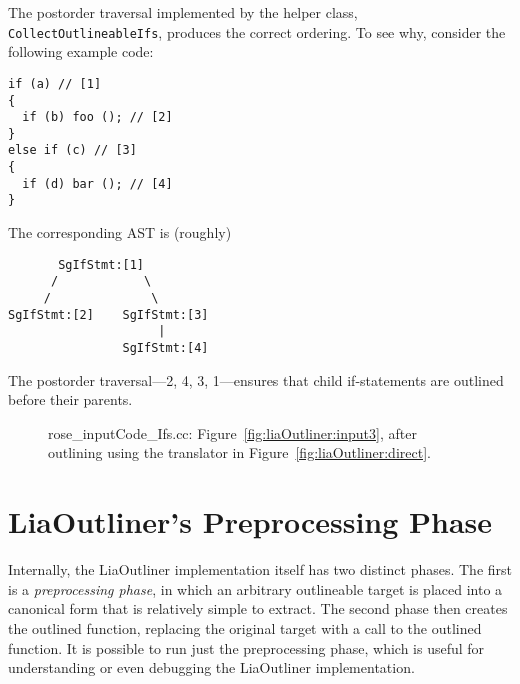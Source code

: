The postorder traversal implemented by the helper class,
\texttt{CollectOutlineableIfs}, produces the correct ordering.  To see
why, consider the following example code:
%
\begin{lstlisting}
if (a) // [1]
{
  if (b) foo (); // [2]
}
else if (c) // [3]
{
  if (d) bar (); // [4]
}
\end{lstlisting}
%
The corresponding AST is (roughly)
\begin{verbatim}
       SgIfStmt:[1]
      /            \
     /              \
SgIfStmt:[2]    SgIfStmt:[3]
                     | 
                SgIfStmt:[4]
\end{verbatim}
%
The postorder traversal---2, 4, 3, 1---ensures that child
if-statements are outlined before their parents.

\begin{figure}[!h]
{\indent
{\mySmallFontSize
\begin{latexonly}
   
\end{latexonly}
\begin{htmlonly}
   
\end{htmlonly}

}
}
\caption{rose\_inputCode\_Ifs.cc: Figure~\ref{fig:liaOutliner:input3},
after outlining using the translator in
Figure~\ref{fig:liaOutliner:direct}.}
\label{fig:liaOutliner:output3}
\end{figure}

\section{LiaOutliner's Preprocessing Phase}
\label{sec:liaOutliner:preproc}

Internally, the LiaOutliner implementation itself has two distinct
phases. The first is a \emph{preprocessing phase}, in which an
arbitrary outlineable target is placed into a canonical form that is
relatively simple to extract. The second phase then creates the
outlined function, replacing the original target with a call to the
outlined function. It is possible to run just the preprocessing phase,
which is useful for understanding or even debugging the LiaOutliner
implementation.

